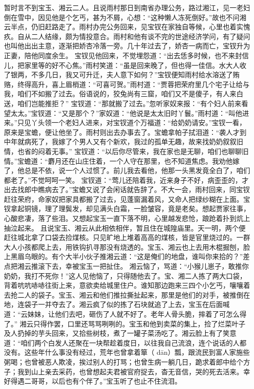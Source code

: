 \documentclass[12pt,oneside]{book}
\begin{document}
暂时言不到宝玉、湘云二人。且说雨村那日到南省办理公务，路过湘江，见一老妇倒在雪中，因见他是个乞丐，甚为不屑，心想：“这种懒人冻死倒好。”故也不问湘云半点，仍旧赶路走了。雨村办完公务回来，见宝钗在家独自等候，心里也着实愧疚。自从二人结缘，颇为情投意合。雨村和他有谈不完的世途经济学问，有了疑问也叫他出出主意，逐渐把娇杏冷落一旁。几十年过去了，娇杏一病而亡，宝钗升为正妻，陪他同度余生。
宝钗见他回来，不觉埋怨道：“出去恁多时候，也不来封信儿，把家里等的好不心焦。”雨村笑道：“虽是回来晚了，但也得一佳信。水大人收了银两，不多几日，我又可升迁，夫人意下如何？”宝钗便知雨村给水溶送了贿赂，终得高升，喜上眉梢道：“可喜可贺。”雨村道：“贾蓉把荣府里几个宅子让给与我，咱们不如搬了过去。俗语说的，狡兔尚有三窟，咱们又不是傻子，有人来白送，咱们岂能推拒？”
宝钗道：“那就搬了过去。”忽听家奴来报：“有个妇人前来看望太太。”宝钗道：“又是那个？”家奴道：“他说是太太旧时丫鬟。”雨村道：“叫他进来。”只见丫头领一个老妇人进来，对宝钗道个万福道：“给奶奶请安。”宝钗一看，原来是宝蟾，便让他坐了。雨村则出去办事去了。宝蟾拿帕子拭泪道：“袭人才到中年就病死了，我嫁了个男人又有个新欢，我过的孤单无趣，故来找奶奶叙叙旧情，也省的闷着无事。”
宝钗道：“以后你尽管来，我在家也是无聊，咱们也聊聊旧情。”宝蟾道：“麝月还在山庄住着，一个人守在那里，也不知道焦虑。我劝他嫁了，他总是不依，说一个人过惯了。前儿我去看他，他那一头黑发竟全白了，咱们都老了。”不觉呵呵一笑。
宝钗道：“莺儿还陪着我，近来身子不好，病歪歪的，才出去找郎中瞧病去了。”宝蟾又说了会闲话就告辞了。不大一会，雨村回来，同宝钗赶往荣府，命家奴把家具都搬了过去，见蓬窗漏着风，又命人把绿纱糊在上面。宝钗拿起铜镜，理了理鬓发，却见满头白霜，一脸皱容，竟是老矣。想起贾家往事，心酸悲凄，落了些泪。又想起宝玉一直下落不明，心里越发悲怆，踉跄着扑到炕上抽泣起来。
且说宝玉、湘云从此相依相伴，暂且住在城隍庙里。天一明，两个便赶往城北拿了口袋去捡煤核。只见旷地上堆着高高的煤核，皆是官里烧过的。一群大人小孩都爬上去，用铁钩扒寻那没有烧透的。宝玉、湘云也上去用木棍掘刨，脸上黑眉乌眼的。有个大半小伙子推湘云道：“这是俺们的地盘，谁叫你来拾的？”差点把湘云推滚下去，幸被宝玉一把扯住。
湘云恼了，骂道：“小猴儿崽子，敢推你奶奶，我打不死你！”这人见他恼了，只得随他去了。宝、湘二人拣了两大口袋，背着吭吭哧哧往街上来，意欲卖给城里住户。谁知那边跑来三四个小乞丐，嚷嚷着去抢二人的袋子。宝玉、湘云和他们推拉撕扯起来，那里是他们的对手，被推倒在地，连袋子一并夺去了。湘云疯了似的拣了石块就追了上去，宝玉在后面喊道：“云妹妹，让他们去吧，砸伤了人就不好了。老年人骨头脆，摔着了可怎么得了。”
湘云只得作罢，口里还骂骂咧咧的。宝玉和他到卖菜的集上，捡了烂菜叶子及人扔掉的芋头回来，又拾些树枝，煮了一罐子菜汤吃了。湘云脸上有了笑意道：“咱们两个白发人还聚在一块帮趁着度日，以往我自己流浪，连个说话的人都没有。这些年什么事没有经过，荒年也曾拿着箪（ dān）瓢，跟流民到富人家施些粥喝；也曾被恶人欺凌，挨过别人的打骂；也曾生病一躺几日，跪求着郎中给个方子；我到山上亲去采药，也曾想起夫君被官府捉去，杳无音信，哭的死去活来。幸好得遇二哥哥，以后也有个伴了。”宝玉听了也止不住流泪。
\end{document}

